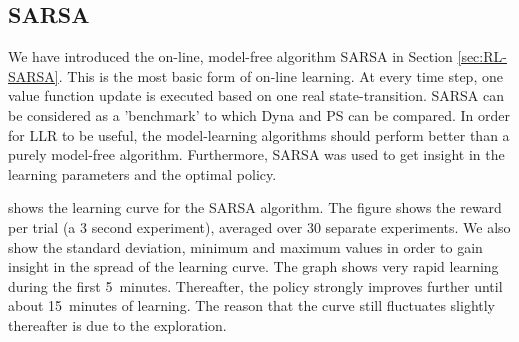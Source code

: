 \subsection{SARSA} \label{sec:PS-SARSA}
We have introduced the on-line, model-free algorithm SARSA in Section \ref{sec:RL-SARSA}. This is the most basic form of on-line learning. At every time step, one value function update is executed based on one real state-transition. SARSA can be considered as a 'benchmark' to which Dyna and \ac{PS} can be compared. In order for \ac{LLR} to be useful, the model-learning algorithms should perform better than a purely model-free algorithm. Furthermore, SARSA was used to get insight in the learning parameters and the optimal policy.

 shows the learning curve for the SARSA algorithm. The figure shows the reward per trial (a 3 second experiment), averaged over 30 separate experiments. We also show the standard deviation, minimum and maximum values in order to gain insight in the spread of the learning curve. The graph shows very rapid learning during the first 5~minutes. Thereafter, the policy strongly improves further until about 15~minutes of learning. The reason that the curve still fluctuates slightly thereafter is due to the exploration. 

